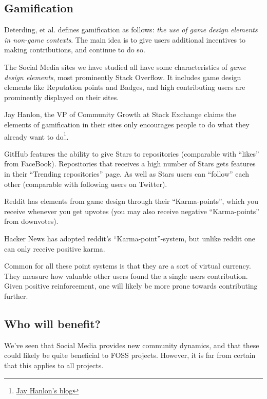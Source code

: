 \documentclass[a4paper,11pt]{article} %
\begin{document}
\subsection{Gamification}

Deterding, et al.\cite{deterding2011game} defines gamification as follows:
\textit{the use of game design elements in non-game contexts}. The main idea
is to give users additional incentives to making contributions, and continue
to do so.

The Social Media sites we have studied all have some characteristics of
\textit{game design elements}, most prominently Stack Overflow. It includes
game design elements like Reputation points and Badges, and high contributing
users are prominently displayed on their sites.

Jay Hanlon, the VP of Community Growth at Stack Exchange claims the elements
of gamification in their sites only encourages people to do what they
already want to
do\footnote{{\href{http://blog.stackoverflow.com/2013/09/five-years-ago-stack-overflow-launched-then-a-miracle-occurred/}{Jay
      Hanlon's blog}}}.

GitHub features the ability to give Stars to repositories (comparable with
``likes'' from FaceBook). Repositories that receives a high number of Stars
gets features in their ``Trending repositories'' page. As well as Stars
users can ``follow'' each other (comparable with following users on
Twitter).

Reddit has elements from game design through their ``Karma-points'', which
you receive whenever you get upvotes (you may also receive negative
``Karma-points'' from downvotes).

Hacker News has adopted reddit's ``Karma-point''-system, but unlike reddit
one can only receive positive karma.

Common for all these point systems is that they are a sort of virtual
currency. They measure how valuable other users found the a single users
contribution. Given positive reinforcement, one will likely be more prone
towards contributing further.

\subsection{Who will benefit?}

We've seen that Social Media provides new community dynamics, and that
these could likely be quite beneficial to FOSS projects. However, it
is far from certain that this applies to all projects.
\end{document}
